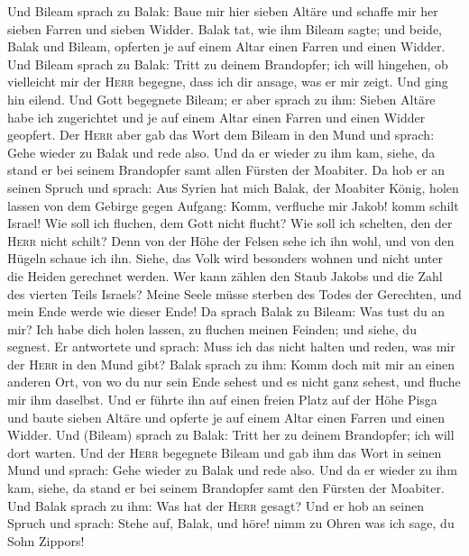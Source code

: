  Und Bileam sprach zu Balak: Baue mir hier sieben Altäre
und schaffe mir her sieben Farren und sieben Widder. 
Balak tat, wie ihm Bileam sagte; und beide, Balak und Bileam, opferten
je auf einem Altar einen Farren und einen Widder.  Und
Bileam sprach zu Balak: Tritt zu deinem Brandopfer; ich will hingehen,
ob vielleicht mir der \textsc{Herr} begegne, dass ich dir ansage, was er
mir zeigt. Und ging hin eilend.  Und Gott begegnete
Bileam; er aber sprach zu ihm: Sieben Altäre habe ich zugerichtet und je
auf einem Altar einen Farren und einen Widder geopfert. 
Der \textsc{Herr} aber gab das Wort dem Bileam in den Mund und sprach:
Gehe wieder zu Balak und rede also.  Und da er wieder zu
ihm kam, siehe, da stand er bei seinem Brandopfer samt allen Fürsten der
Moabiter.  Da hob er an seinen Spruch und sprach: Aus
Syrien hat mich Balak, der Moabiter König, holen lassen von dem Gebirge
gegen Aufgang: Komm, verfluche mir Jakob! komm schilt Israel!
 Wie soll ich fluchen, dem Gott nicht flucht? Wie soll ich
schelten, den der \textsc{Herr} nicht schilt?  Denn von
der Höhe der Felsen sehe ich ihn wohl, und von den Hügeln schaue ich
ihn. Siehe, das Volk wird besonders wohnen und nicht unter die Heiden
gerechnet werden.  Wer kann zählen den Staub Jakobs und
die Zahl des vierten Teils Israels? Meine Seele müsse sterben des Todes
der Gerechten, und mein Ende werde wie dieser Ende!  Da
sprach Balak zu Bileam: Was tust du an mir? Ich habe dich holen lassen,
zu fluchen meinen Feinden; und siehe, du segnest.  Er
antwortete und sprach: Muss ich das nicht halten und reden, was mir der
\textsc{Herr} in den Mund gibt?  Balak sprach zu ihm:
Komm doch mit mir an einen anderen Ort, von wo du nur sein Ende sehest
und es nicht ganz sehest, und fluche mir ihm daselbst. 
Und er führte ihn auf einen freien Platz auf der Höhe Pisga und baute
sieben Altäre und opferte je auf einem Altar einen Farren und einen
Widder.  Und (Bileam) sprach zu Balak: Tritt her zu
deinem Brandopfer; ich will dort warten.  Und der
\textsc{Herr} begegnete Bileam und gab ihm das Wort in seinen Mund und
sprach: Gehe wieder zu Balak und rede also.  Und da er
wieder zu ihm kam, siehe, da stand er bei seinem Brandopfer samt den
Fürsten der Moabiter. Und Balak sprach zu ihm: Was hat der \textsc{Herr}
gesagt?  Und er hob an seinen Spruch und sprach: Stehe
auf, Balak, und höre! nimm zu Ohren was ich sage, du Sohn Zippors!
